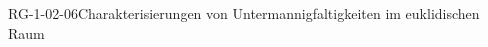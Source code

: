 
\begin{PROP}{RG-1-02-06}{Charakterisierungen von Untermannigfaltigkeiten im euklidischen Raum}
\end{PROP}
